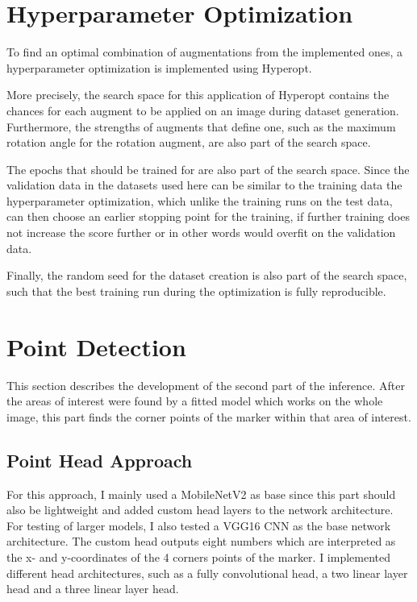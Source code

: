 \documentclass[10pt]{book}
\begin{document}
\section{Hyperparameter Optimization}
\label{sec:hyper_opt}

To find an optimal combination of augmentations from the implemented ones, a hyperparameter optimization is implemented using Hyperopt. 

More precisely, the search space for this application of Hyperopt contains the chances for each augment to be applied on an image during dataset generation. Furthermore, the strengths of augments that define one, such as the maximum rotation angle for the rotation augment, are also part of the search space. 

The epochs that should be trained for are also part of the search space. Since the validation data in the datasets used here can be similar to the training data the hyperparameter optimization, which unlike the training runs on the test data, can then choose an earlier stopping point for the training, if further training does not increase the score further or in other words would overfit on the validation data. 

Finally, the random seed for the dataset creation is also part of the search space, such that the best training run during the optimization is fully reproducible.

\section{Point Detection}

This section describes the development of the second part of the inference. After the areas of interest were found by a fitted model which works on the whole image, this part finds the corner points of the marker within that area of interest.

\subsection{Point Head Approach}

For this approach, I mainly used a MobileNetV2 as base since this part should also be lightweight and added custom head layers to the network architecture. For testing of larger models, I also tested a VGG16 \ac{CNN} as the base network architecture. The custom head outputs eight numbers which are interpreted as the x- and y-coordinates of the 4 corners points of the marker. I implemented different head architectures, such as a fully convolutional head, a two linear layer head and a three linear layer head.
\end{document}
